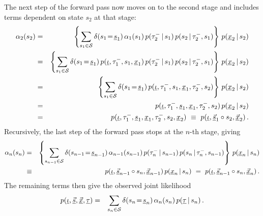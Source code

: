 \documentclass[a4paper]{article}
\begin{document}
The next step of the forward pass now moves on to the second stage and includes terms dependent on state $s_2$ at that stage:
\begin{eqnarray}
  \alpha_2(s_2) & = & 
\left\{\sum_{s_1\in{\cal S}}\delta(s_1\!=\!\underline{s}_1)\,
\alpha_1(s_1)\,p(\tau^-_2\,|\,s_1)\,p(s_2\,|\,\tau^-_2,s_1)\right\}
\,p(\underline{x}_2\,|\,s_2)
\nonumber\\&=&
\left\{\sum_{s_1\in{\cal S}}\delta(s_1\!=\!\underline{s}_1)\,
p(\underline{\iota},\tau^-_1,s_1,\underline{x}_1)\,p(\tau^-_2\,|\,s_1)\,p(s_2\,|\,\tau^-_2,s_1)\right\}
\,p(\underline{x}_2\,|\,s_2)
\nonumber\\&=&
\left\{\sum_{s_1\in{\cal S}}\delta(s_1\!=\!\underline{s}_1)\,
p(\underline{\iota},\tau^-_1,s_1,\underline{x}_1,\tau^-_2,s_2)\right\}
\,p(\underline{x}_2\,|\,s_2)
\nonumber\\&=&
p(\underline{\iota},\tau^-_1,\underline{s}_1,\underline{x}_1,\tau^-_2,s_2)\,p(\underline{x}_2\,|\,s_2)
\nonumber\\&=&
p(\underline{\iota},\tau^-_1,\underline{s}_1,\underline{x}_1,\tau^-_2,s_2,\underline{x}_2)
~\equiv~p(\underline{\iota},\underline{\vec{s}}_1\circ s_2,\underline{\vec{x}}_2)
\,.
\label{eq:alpha_2}
\end{eqnarray}
Recursively, the last step of the forward pass stops at the $n$-th stage, giving
\begin{eqnarray}
  \alpha_n(s_n) & = & 
\left\{\sum_{s_{n-1}\in{\cal S}}\delta(s_{n-1}\!=\!\underline{s}_{n-1})\,
\alpha_{n-1}(s_{n-1})\,p(\tau^-_n\,|\,s_{n-1})\,p(s_n\,|\,\tau^-_n,s_{n-1})\right\}
\,p(\underline{x}_n\,|\,s_n)
\nonumber\\&\equiv&
p(\underline{\iota},\underline{\vec{s}}_{n-1}\circ s_n,\underline{\vec{x}}_{n-1})\,p(\underline{x}_n\,|\,s_n)
~=~p(\underline{\iota},\underline{\vec{s}}_{n-1}\circ s_n,\underline{\vec{x}}_n)
\,.
\label{eq:alpha_n}
\end{eqnarray}
The remaining terms then give the observed joint likelihood
\begin{eqnarray}
   p(\underline{\iota},\underline{\vec{s}},\underline{\vec{x}},\underline{\tau}) 
& = & 
   \sum_{s_n\in{\cal S}}\delta(s_n\!=\!\underline{s}_n)\,\alpha_n(s_n)\,p(\underline{\tau}\,|\,s_n)\,.
\label{eq:alpha_n_beta_n}
\end{eqnarray}
\end{document}
